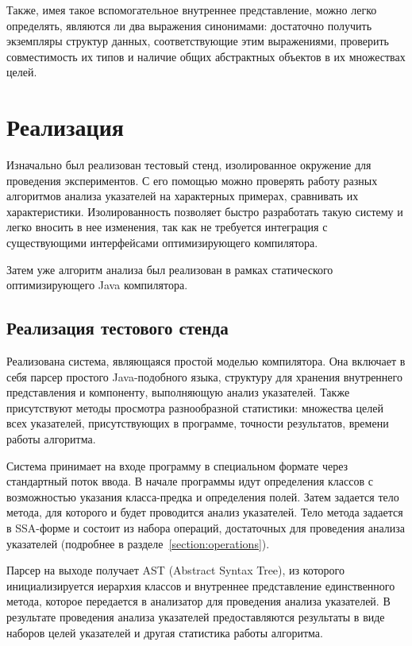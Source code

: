 \documentclass[14pt,titlepage]{extarticle}
\newcommand{\eng}[1]{{\English#1}}
\let\oldsection\section
\renewcommand{\section}{\newpage\oldsection}
\newcommand{\java}{\eng{Java}\xspace}
\begin{document}
      Также, имея такое вспомогательное внутреннее представление, можно легко
      определять, являются ли два выражения синонимами: достаточно получить
      экземпляры структур данных, соответствующие этим выражениями, проверить
      совместимость их типов и наличие общих абстрактных объектов в их
      множествах целей.

  \section{Реализация}

    Изначально был реализован тестовый стенд, изолированное окружение для
    проведения экспериментов. С его помощью можно проверять работу
    разных алгоритмов анализа указателей на характерных примерах, сравнивать их
    характеристики. Изолированность позволяет быстро разработать такую систему
    и легко вносить в нее изменения, так как не требуется интеграция с
    существующими интерфейсами оптимизирующего компилятора.

    Затем уже алгоритм анализа был реализован в рамках статического
    оптимизирующего \java компилятора.

    \subsection{Реализация тестового стенда}

      Реализована система, являющаяся простой моделью компилятора. Она включает
      в себя парсер простого \java-подобного языка, структуру для хранения
      внутреннего представления и компоненту, выполняющую анализ указателей.
      Также присутствуют методы просмотра разнообразной статистики: множества
      целей всех указателей, присутствующих в программе, точности результатов,
      времени работы алгоритма.

      Система принимает на входе программу в специальном формате через
      стандартный поток ввода. В начале программы идут определения классов
      с возможностью указания класса-предка и определения полей. Затем задается
      тело метода, для которого и будет проводится анализ указателей.
      Тело метода задается в SSA-форме и состоит из набора операций,
      достаточных для проведения анализа указателей (подробнее в
      разделе~\ref{section:operations}).

      Парсер на выходе получает AST (\eng{Abstract Syntax Tree}), из которого
      инициализируется иерархия классов и внутреннее представление
      единственного метода, которое передается в анализатор для проведения
      анализа указателей. В результате проведения анализа указателей
      предоставляются результаты в виде наборов целей указателей и другая
      статистика работы алгоритма.
\end{document}
